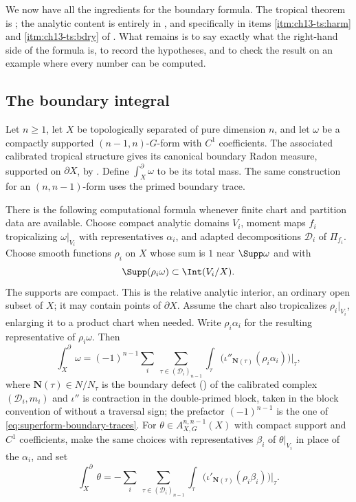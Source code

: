 We now have all the ingredients for the boundary formula.  The tropical
theorem is ; the analytic content is entirely in
, and specifically in items
\cref{itm:ch13-ts:harm} and \cref{itm:ch13-ts:bdry} of
.  What remains is to say exactly
what the right-hand side of the formula is, to record the hypotheses, and to
check the result on an example where every number can be computed.

\subsection{The boundary integral}
\label{sec:ch13-boundary-integral}

\begin{definition}
\label{def:ch13-boundary-integral}
Let $n\ge1$, let $X$ be topologically separated of pure dimension $n$,
and let $\omega$ be a compactly supported $(n-1,n)$-$G$-form with $C^1$
coefficients.  The associated calibrated tropical structure gives its
canonical boundary Radon measure, supported on $\partial X$, by
\cite[\S5.9 and Theorem~15.7.1]{CLD25}.  Define
$\int_X^\partial\omega$ to be its total mass.  The same construction
for an $(n,n-1)$-form uses the primed boundary trace.

There is the following computational formula whenever finite chart and
partition data are available.  Choose compact analytic domains $V_i$,
moment maps $f_i$ tropicalizing $\omega|_{V_i}$ with representatives
$\alpha_i$, and adapted decompositions $\mathscr D_i$ of $\Pi_{f_i}$.
Choose smooth functions $\rho_i$ on $X$ whose sum is $1$ near
$\Supp\omega$ and with
\[
 \Supp(\rho_i\omega)\subset\Int(V_i/X).
\]
The supports are compact.  This is the relative analytic interior, an
ordinary open subset of $X$; it may contain points of $\partial X$.
Assume the chart also tropicalizes $\rho_i|_{V_i}$, enlarging it to a
product chart when needed.  Write $\rho_i\alpha_i$ for the resulting
representative of $\rho_i\omega$.  Then
\begin{equation}
\label{eq:ch13-boundary-integral}
 \int_X^{\partial}\omega
 =(-1)^{n-1}\sum_i\ \sum_{\tau\in(\mathscr D_i)_{n-1}}
   \int_\tau\bigl(\iota''_{\mathbf N(\tau)}(\rho_i\alpha_i)\bigr)\big|_\tau ,
\end{equation}
where $\mathbf N(\tau)\in N/N_\tau$ is the boundary defect
() of the calibrated complex
$(\mathscr D_i,m_i)$ and $\iota''$ is contraction in the double-primed block,
taken in the block convention of
 without a traversal sign;
the prefactor $(-1)^{n-1}$ is the one of
\eqref{eq:superform-boundary-traces}.  For $\theta\in A^{n,n-1}_{X,G}(X)$ with
compact support and $C^1$ coefficients, make the same choices with
representatives $\beta_i$ of $\theta|_{V_i}$ in place of the $\alpha_i$, and
set
\[
 \int_X^{\partial}\theta
 =-\sum_i\ \sum_{\tau\in(\mathscr D_i)_{n-1}}
   \int_\tau\bigl(\iota'_{\mathbf N(\tau)}(\rho_i\beta_i)\bigr)\big|_\tau .
\]
\end{definition}

